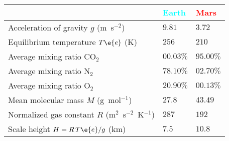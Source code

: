\begin{table}
\begin{tabular}{lll}
						& \textcolor{cyan}{Earth}	& \textcolor{red}{Mars}\\
\hline
Acceleration of gravity $g$ (m~s$^{-2}$)	& $9.81$		& $3.72$\\
Equilibrium temperature $T\e{e}$ (K)		& $256$			& $210$\\
\hline
Average mixing ratio CO$_2$			& $00.03\%$	& $95.00\%$\\
Average mixing ratio N$_2$			& $78.10\%$	& $02.70\%$\\
Average mixing ratio O$_2$			& $20.90\%$	& $00.13\%$\\
\hline
Mean molecular mass $M$ (g~mol$^{-1}$)		& $27.8$		& $43.49$\\
Normalized gas constant $R$ %
(m$^2$~s$^{-2}$~K$^{-1}$)	& $287$			& $192$\\
\hline
Scale height $H=R\,T\e{e}/g$ (km)				& $7.5$			& $10.8$\\
\hline
\end{tabular}
\end{table}
